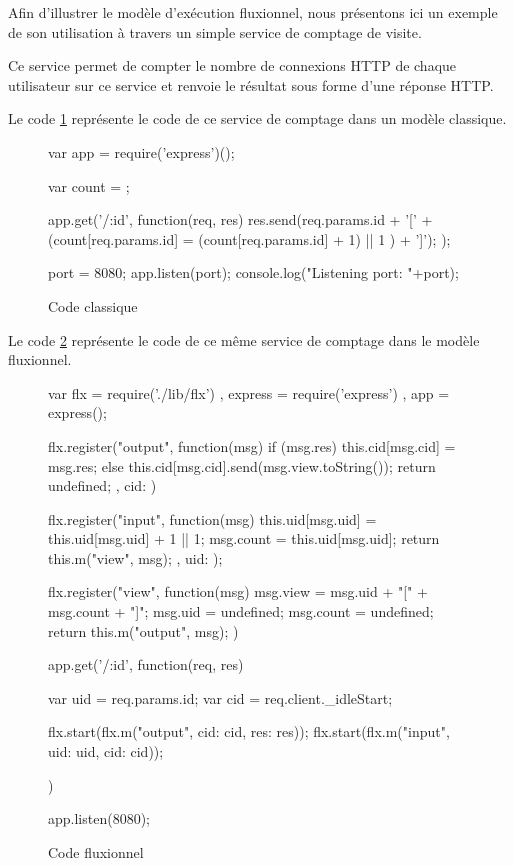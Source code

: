 Afin d'illustrer le modèle d'exécution fluxionnel, nous présentons ici un exemple de son utilisation à travers un simple service de comptage de visite.

Ce service permet de compter le nombre de connexions HTTP de chaque utilisateur sur ce service et renvoie le résultat sous forme d'une réponse HTTP.

Le code \ref{lst:classique} représente le code de ce service de comptage dans un modèle classique.

\begin{figure}
  \begin{code}
  var app = require('express')();

  var count = {};

  app.get('/:id', function(req, res){
    res.send(req.params.id + '[' + (count[req.params.id] = (count[req.params.id] + 1) || 1 ) + ']');
  });

  port = 8080;
  app.listen(port);
  console.log("Listening port: "+port);
  \end{code}
  \caption{Code classique}
  \label{lst:classique}
\end{figure}

Le code \ref{lst:fluxionnel} représente le code de ce même service de comptage dans le modèle fluxionnel.

\begin{figure}
  \begin{code}
  var flx = require('./lib/flx')
    , express = require('express')
    , app = express();

  flx.register("output", function(msg){
    if (msg.res) {
      this.cid[msg.cid] = msg.res;
    } else {
      this.cid[msg.cid].send(msg.view.toString());
    }
    return undefined;
  }, {
    cid: {}
  })

  flx.register("input", function(msg){
    this.uid[msg.uid] = this.uid[msg.uid] + 1 || 1;
    msg.count = this.uid[msg.uid];
    return this.m("view", msg);
  },{
    uid: {}
  });

  flx.register("view", function(msg) {
    msg.view = msg.uid + "[" + msg.count + "]";
    msg.uid = undefined;
    msg.count = undefined;
    return this.m("output", msg);
  })

  app.get('/:id', function(req, res) {
    var uid = req.params.id;
    var cid = req.client._idleStart;

    flx.start(flx.m("output", {cid: cid, res: res}));
    flx.start(flx.m("input", {uid: uid, cid: cid}));
  })

  app.listen(8080);
  \end{code}
  \caption{Code fluxionnel}
  \label{lst:fluxionnel}
\end{figure}

